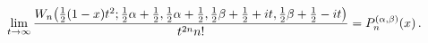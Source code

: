 \[\lim_{t\to\infty}\frac{\mathop{W_{n}\/}\nolimits\!\left(\tfrac{1}{2}(1-x)t^{2}%
;\tfrac{1}{2}\alpha+\tfrac{1}{2},\tfrac{1}{2}\alpha+\tfrac{1}{2},\tfrac{1}{2}%
\beta+\tfrac{1}{2}+it,\tfrac{1}{2}\beta+\tfrac{1}{2}-it\right)}{t^{2n}n!}=%
\mathop{P^{(\alpha,\beta)}_{n}\/}\nolimits\!\left(x\right).\]